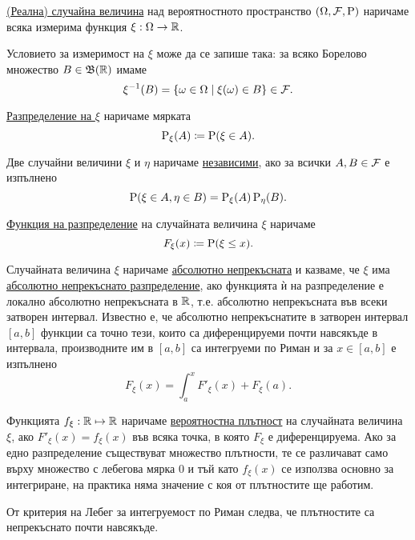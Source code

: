 \documentclass[numbers=endperiod, DIV=15, bibliography=totocnumbered]{scrartcl}
\begin{document}
\begin{definition}
  \uline{(Реална) случайна величина} над вероятностното пространство $(\Omega, \mathcal{F}, \operatorname{P})$ наричаме всяка измерима функция $\xi : \Omega \to \mathbb{R}$.

  Условието за измеримост на $\xi$ може да се запише така: за всяко Борелово множество $B \in \mathfrak{B}(\mathbb{R})$ имаме
  \begin{displaymath}
    \xi^{-1} (B) = \{ \omega \in \Omega \mid \xi(\omega) \in B \} \in \mathcal{F}.
  \end{displaymath}

  \uline{Разпределение на $\xi$} наричаме мярката
  \begin{displaymath}
    \operatorname{P}_\xi(A) \coloneqq \operatorname{P}(\xi \in A).
  \end{displaymath}

  Две случайни величини $\xi$ и $\eta$ наричаме \uline{независими}, ако за всички $A, B \in \mathcal{F}$ е изпълнено
  \begin{displaymath}
    \operatorname{P}(\xi \in A, \eta \in B) = \operatorname{P}_\xi(A) \operatorname{P}_\eta(B).
  \end{displaymath}

  \uline{Функция на разпределение} на случайната величина $\xi$ наричаме
  \begin{displaymath}
    F_\xi(x) \coloneqq \operatorname{P}(\xi \leq x).
  \end{displaymath}

  Случайната величина $\xi$ наричаме \uline{абсолютно непрекъсната} и казваме, че $\xi$ има \uline{абсолютно непрекъснато разпределение}, ако функцията ѝ на разпределение е локално абсолютно непрекъсната в $\mathbb{R}$, т.е. абсолютно непрекъсната във всеки затворен интервал. Известно е, че абсолютно непрекъснатите в затворен интервал $[a, b]$ функции са точно тези, които са диференцируеми почти навсякъде в интервала, производните им в $[a, b]$ са интегруеми по Риман и за $x \in [a, b]$ е изпълнено
  \begin{displaymath}
    F_\xi(x) = \int_a^x F'_\xi(x) + F_\xi(a).
  \end{displaymath}

  Функцията $f_\xi: \mathbb{R} \mapsto \mathbb{R}$ наричаме \uline{вероятностна плътност} на случайната величина $\xi$, ако $F'_\xi(x) = f_\xi(x)$ във всяка точка, в която $F_\xi$ е диференцируема. Ако за едно разпределение съществуват множество плътности, те се различават само върху множество с лебегова мярка 0 и тъй като $f_\xi(x)$ се използва основно за интегриране, на практика няма значение с коя от плътностите ще работим.

  От критерия на Лебег за интегруемост по Риман следва, че плътностите са непрекъснато почти навсякъде.
\end{definition}
\end{document}

